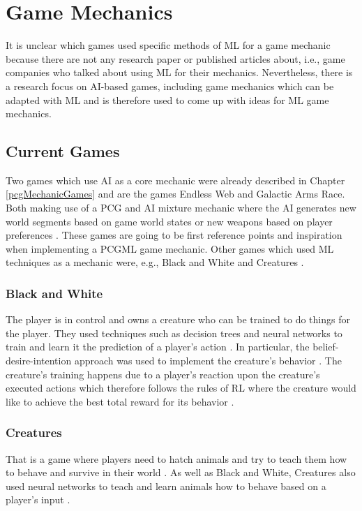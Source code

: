 \documentclass[MGS,Master,english]{twbook}%
\begin{document}
\section{Game Mechanics}
It is unclear which games used specific methods of ML for a game mechanic because there are not any research paper or published articles about, i.e., game companies who talked about using ML for their mechanics. Nevertheless, there is a research focus on AI-based games, including game mechanics which can be adapted with ML and is therefore used to come up with ideas for ML game mechanics. 

\subsection{Current Games}
Two games which use AI as a core mechanic were already described in Chapter \ref{pcgMechanicGames} and are the games Endless Web and Galactic Arms Race. Both making use of a PCG and AI mixture mechanic where the AI generates new world segments based on game world states \cite{pcg::endlessWeb} or new weapons based on player preferences \cite{pcg::galacticArmsRace}. These games are going to be first reference points and inspiration when implementing a PCGML game mechanic. Other games which used ML techniques as a mechanic were, e.g., Black and White and Creatures \cite{ml::mostInfluentalAiGames}. 

\subsubsection{Black and White}
The player is in control and owns a creature who can be trained to do things for the player. They used techniques such as decision trees and neural networks to train and learn it the prediction of a player's action \cite{ml::gamasutra::ml} \cite{ml::mostInfluentalAiGames}. In particular, the belief-desire-intention approach was used to implement the creature's behavior \cite{ml::mostInfluentalAiGames}. The creature's training happens due to a player’s reaction upon the creature's executed actions which therefore follows the rules of RL where the creature would like to achieve the best total reward for its behavior \cite{ml::gamasutra::ml}.

\subsubsection{Creatures}
That is a game where players need to hatch animals and try to teach them how to behave and survive in their world \cite{ml::mostInfluentalAiGames}. As well as Black and White, Creatures also used neural networks to teach and learn animals how to behave based on a player's input \cite{ml::mostInfluentalAiGames}.
\end{document}
